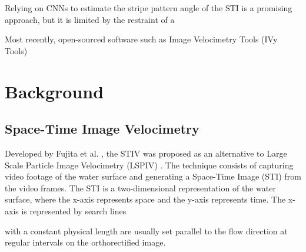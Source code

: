 \documentclass[12pt]{elsarticle}
\begin{document}
Relying on CNNs to estimate the stripe pattern angle of the STI is a promising approach, but it is limited by the restraint of a 

Most recently, open-sourced software such as Image Velocimetry Tools (IVy Tools) \cite{engel2025ivytools}


\section{Background}
\subsection{Space-Time Image Velocimetry}
Developed by Fujita et al. \cite{fujita2007development}, the STIV was proposed as an alternative to Large Scale Particle Image Velocimetry (LSPIV) \cite{fujita1998large}. The technique consists of capturing video footage of the water surface and generating a Space-Time Image (STI) from the video frames. The STI is a two-dimensional representation of the water surface, where the x-axis represents space and the y-axis represents time. The x-axis is represented by search lines

with a constant physical length are usually set parallel to the flow direction at regular intervals on the orthorectified image.
\end{document}
